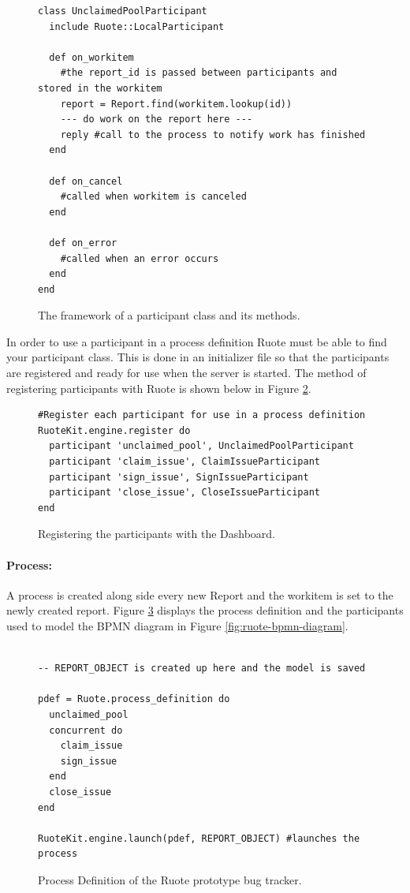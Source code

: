 \begin{figure}[!ht]
  \begin{lstlisting}
class UnclaimedPoolParticipant
  include Ruote::LocalParticipant

  def on_workitem
    #the report_id is passed between participants and stored in the workitem
    report = Report.find(workitem.lookup(id))
    --- do work on the report here ---
    reply #call to the process to notify work has finished
  end

  def on_cancel
    #called when workitem is canceled
  end

  def on_error
    #called when an error occurs
  end
end
  \end{lstlisting}
  \caption{The framework of a participant class and its methods.}
  \label{fig:ruote-prototype-participant-code}
\end{figure}

In order to use a participant in a process definition Ruote must be able to find your participant class. This is done in an initializer file so that the participants are registered and ready for use when the server is started. The method of registering participants with Ruote is shown below in Figure \ref{fig:ruote-prototype-participant-register}.

\begin{figure}[!ht]
  \begin{lstlisting}
#Register each participant for use in a process definition
RuoteKit.engine.register do
  participant 'unclaimed_pool', UnclaimedPoolParticipant
  participant 'claim_issue', ClaimIssueParticipant
  participant 'sign_issue', SignIssueParticipant
  participant 'close_issue', CloseIssueParticipant
end
  \end{lstlisting}
  \caption{Registering the participants with the Dashboard.}
  \label{fig:ruote-prototype-participant-register}
\end{figure}

\paragraph{Process:} A process is created along side every new Report and the workitem is set to the newly created report. Figure \ref{fig:ruote-prototype-process-definition} displays the process definition and the participants used to model the BPMN diagram in Figure \ref{fig:ruote-bpmn-diagram}.

\begin{figure}[!ht]
  \begin{lstlisting}

-- REPORT_OBJECT is created up here and the model is saved

pdef = Ruote.process_definition do
  unclaimed_pool
  concurrent do
    claim_issue
    sign_issue
  end
  close_issue
end

RuoteKit.engine.launch(pdef, REPORT_OBJECT) #launches the process

  \end{lstlisting}
  \caption{Process Definition of the Ruote prototype bug tracker.}
  \label{fig:ruote-prototype-process-definition}
\end{figure}

